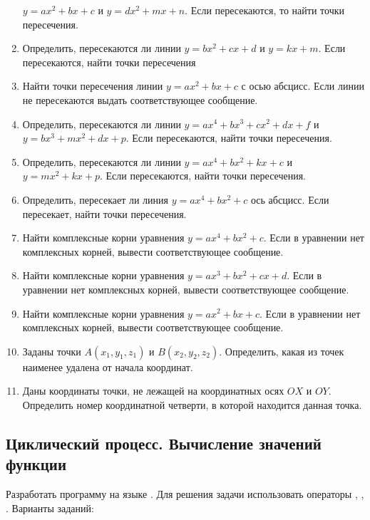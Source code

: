 \begin{enumerate}
$y=ax^2+bx+c$ и $y=dx^2+mx+n$. Если
пересекаются, то найти точки пересечения.
\item Определить, пересекаются ли линии
$y=bx^2+cx+d$ и
$y=kx+m$. Если пересекаются, найти точки пересечения
\item Найти точки пересечения линии
$y=ax^2+bx+c$ с осью
абсцисс. Если линии не пересекаются выдать соответствующее сообщение.
\item Определить, пересекаются ли линии
$y=ax^4+bx^3+cx^2+dx+f$
и
$y=bx^3+mx^2+dx+p$.
Если пересекаются, найти точки пересечения.
\item Определить, пересекаются ли линии
$y=ax^4+bx^2+kx+c$
и
$y=mx^2+kx+p$.
Если пересекаются, найти точки пересечения.
\item Определить, пересекает ли линия
$y=ax^4+bx^2+c$
ось абсцисс. Если пересекает, найти точки пересечения.
\item Найти комплексные корни уравнения
$y=ax^4+bx^2+c$.
Если в уравнении нет комплексных корней, вывести соответствующее сообщение.
\item Найти комплексные корни уравнения
$y=ax^3+bx^2+cx+d$. Если в
уравнении нет комплексных корней, вывести соответствующее сообщение.
\item Найти комплексные корни уравнения $y=ax^2+bx+c$. Если в
уравнении нет комплексных корней, вывести соответствующее сообщение.
\item Заданы точки $A(x_1,y_1,z_1)$ и $B(x_2,y_2,z_2)$. Определить, какая из точек наименее удалена от начала координат.
\item Даны координаты точки, не лежащей на координатных осях $OX$ и $OY$. Определить номер координатной четверти, в которой
находится данная точка.
\end{enumerate}

\subsection[Циклический процесс. Вычисление значений функции]{Циклический процесс. Вычисление значений функции}

Разработать программу на языке . Для решения задачи использовать операторы ,
, . Варианты заданий:

